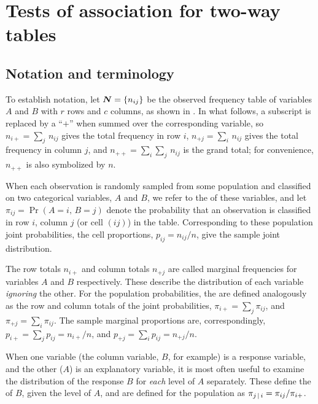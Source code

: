 \section{Tests of association for two-way tables}\label{sec:twoway-tests}

\subsection{Notation and terminology}\label{sec:twoway-notation}
To establish notation, let \(\bm{N}  =  \{  n_{ij}  \}\) be the
observed frequency table of variables \(A\) and \(B\) with \(r\) rows
and \(c\) columns, as shown in .
In what follows, a subscript is replaced by a ``$+$''
when summed over the corresponding variable, so \(n_{i+}  =  \sum_j \,
n_{ij}\) gives the total frequency in row \(i\), \(n_{+j}  =  \sum_i \,
n_{ij}\) gives the total frequency in column \(j\), and \(n_{++}  =
\sum_i \sum_j \,  n_{ij}\) is the grand total; for convenience,
\(n_{++}\) is also symbolized by \(n\).


When each observation is randomly sampled from some population
and classified on two categorical variables, $A$ and $B$,
we refer to the  of these variables,
and let $\pi_{ij} = \Pr(A=i,\,B=j)$ denote the probability that
an observation is classified in row $i$, column $j$ (or cell $(ij)$)
in the table.
Corresponding to these population joint probabilities, the
cell proportions, $p_{ij} = n_{ij} / n$, give the sample joint
distribution.

The row totals $n_{i+}$ and column totals $n_{+j}$ are called marginal frequencies for variables $A$ and $B$ respectively.
These describe the distribution of each variable \emph{ignoring} the other.
For the population probabilities, the 
are defined analogously as the row and column totals of the 
joint probabilities,
$\pi_{i+} = \sum_j \pi_{ij}$, and
$\pi_{+j} = \sum_i \pi_{ij}$.
The sample marginal proportions are, correspondingly, 
$p_{i+} = \sum_j p_{ij} = n_{i+} / n$, and 
$p_{+j} = \sum_i p_{ij} = n_{+j} / n$.

When one variable (the column variable, $B$, for example) is a response
variable, and the other ($A$) is an explanatory variable,
it is most often useful to examine the distribution of the response $B$
for \emph{each} level of $A$ separately.
These define the  of $B$, given the
level of $A$, and are defined for the population as
$\pi_{j\, | \, i} = \pi_{ij} / \pi_{i+}$.

